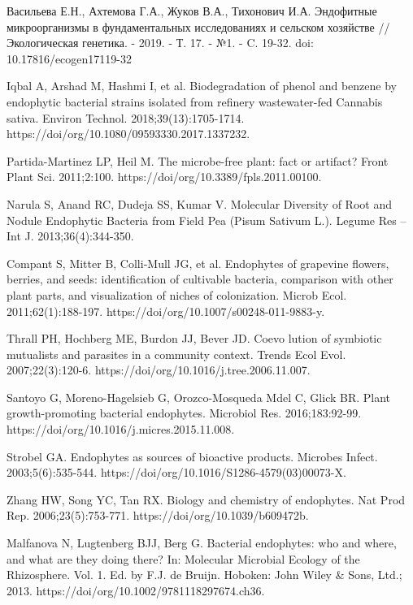 \documentclass[11pt]{article}
\begin{document}
	\begin{thebibliography}{3}
		 Васильева Е.Н., Ахтемова Г.А., Жуков В.А., Тихонович И.А. Эндофитные микроорганизмы в фундаментальных исследованиях и сельском хозяйстве // Экологическая генетика. - 2019. - Т. 17. - №1. - C. 19-32. doi: 10.17816/ecogen17119-32 
		
		 Iqbal A, Arshad M, Hashmi I, et al. Biodegradation of phenol and benzene by endophytic bacterial strains isolated from refinery wastewater-fed Cannabis sativa. Environ Technol. 2018;39(13):1705-1714. https://doi/org/10.1080/09593330.2017.1337232.
		
		 Partida-Martinez LP, Heil M. The microbe-free plant: fact or artifact? Front Plant Sci. 2011;2:100. https://doi/org/10.3389/fpls.2011.00100.
		
		 Narula S, Anand RC, Dudeja SS, Kumar V. Molecular Diversity of Root and Nodule Endophytic Bacteria from Field Pea (Pisum Sativum L.). Legume Res – Int J. 2013;36(4):344-350.
		
		 Compant S, Mitter B, Colli-Mull JG, et al. Endophytes of grapevine flowers, berries, and seeds: identification of cultivable bacteria, comparison with other plant parts, and visualization of niches of colonization. Microb Ecol. 2011;62(1):188-197. https://doi/org/10.1007/s00248-011-9883-y.
		
		 Thrall PH, Hochberg ME, Burdon JJ, Bever JD. Coevo lution of symbiotic mutualists and parasites in a community context. Trends Ecol Evol. 2007;22(3):120-6. https://doi/org/10.1016/j.tree.2006.11.007.
		
		 Santoyo G, Moreno-Hagelsieb G, Orozco-Mosqueda Mdel C, Glick BR. Plant growth-promoting bacterial endophytes. Microbiol Res. 2016;183:92-99. https://doi/org/10.1016/j.micres.2015.11.008.
		
		 Strobel GA. Endophytes as sources of bioactive products. Microbes Infect. 2003;5(6):535-544. https://doi/org/10.1016/S1286-4579(03)00073-X.
		
		 Zhang HW, Song YC, Tan RX. Biology and chemistry of endophytes. Nat Prod Rep. 2006;23(5):753-771. https://doi/org/10.1039/b609472b.
		
		 Malfanova N, Lugtenberg BJJ, Berg G. Bacterial endophytes: who and where, and what are they doing there? In: Molecular Microbial Ecology of the Rhizosphere. Vol. 1. Ed. by F.J. de Bruijn. Hoboken: John Wiley \& Sons, Ltd.; 2013. https://doi/org/10.1002/9781118297674.ch36.
		

\end{thebibliography}
\end{document}
